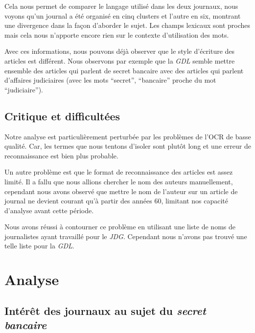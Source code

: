 \documentclass[a4paper, 11pt]{article}
\begin{document}
Cela nous permet de comparer le langage utilisé dans les deux journaux,
nous voyons qu'un journal a été organisé en cinq clusters et l'autre en
six, montrant une divergence dans la façon d'aborder le sujet. Les
champs lexicaux sont proches mais cela nous n'apporte encore rien sur le
contexte d'utilisation des mots.

Avec ces informations, nous pouvons déjà observer que le style
d'écriture des articles est différent. Nous observons par exemple que la
\emph{GDL} semble mettre ensemble des articles qui parlent de secret
bancaire avec des articles qui parlent d'affaires judiciaires (avec les
mots ``secret'', ``bancaire'' proche du mot ``judiciaire'').

\hypertarget{critique-et-difficultuxe9es}{%
\subsection{Critique et
difficultées}\label{critique-et-difficultuxe9es}}

Notre analyse est particulièrement perturbée par les problèmes de l'OCR
de basse qualité. Car, les termes que nous tentons d'isoler sont plutôt
long et une erreur de reconnaissance est bien plus probable.

Un autre problème est que le format de reconnaissance des articles est
assez limité. Il a fallu que nous allions chercher le nom des auteurs
manuellement, cependant nous avons observé que mettre le nom de l'auteur
sur un article de journal ne devient courant qu'à partir des années 60,
limitant nos capacité d'analyse avant cette période.

Nous avons réussi à contourner ce problème en utilisant une liste de
noms de journalistes ayant travaillé pour le \emph{JDG}. Cependant nous
n'avons pas trouvé une telle liste pour la \emph{GDL}.


\hypertarget{analyse}{%
\section{Analyse}\label{analyse}}

\hypertarget{intuxe9ruxeat-des-journaux-au-sujet-du-secret-bancaire}{%
\subsection{\texorpdfstring{Intérêt des journaux au sujet du
\emph{secret
bancaire}}{Intérêt des journaux au sujet du secret bancaire}}\label{intuxe9ruxeat-des-journaux-au-sujet-du-secret-bancaire}}
\end{document}
